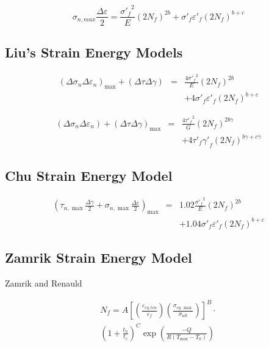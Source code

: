 \documentclass[preprint,5p,twocolumn,11pt,sort&compress]{elsarticle}
\begin{document}
\[{\sigma _{n,max}}\frac{{\Delta \varepsilon }}{2} = \frac{{{{\sigma '}_f}^2}}{E}{\left( {2{N_f}} \right)^{2b}} + {\sigma '_f}{\varepsilon '_f}{\left( {2{N_f}} \right)^{b + c}}\]

\subsection{Liu's Strain Energy Models}
\begin{eqnarray*}
{\left( {\Delta {\sigma _n}\Delta {\varepsilon _n}} \right)_{\max }} + \left( {\Delta \tau \Delta \gamma } \right) &=& \frac{{4{{\sigma '}_f}^2}}{E}{\left( {2{N_f}} \right)^{2b}}
\\
& & + 4{{\sigma '}_f}{{\varepsilon '}_f}{\left( {2{N_f}} \right)^{b + c}}
\end{eqnarray*}

\begin{eqnarray*}
\left( {\Delta {\sigma _n}\Delta {\varepsilon _n}} \right) + {\left( {\Delta \tau \Delta \gamma } \right)_{\max }} &=& \frac{{4{{\tau '}_f}^2}}{G}{\left( {2{N_f}} \right)^{2b\gamma }}
\\
&& + 4{{\tau '}_f}{{\gamma '}_f}{\left( {2{N_f}} \right)^{b\gamma  + c\gamma }}
\end{eqnarray*}

\subsection{Chu Strain Energy Model}
\begin{eqnarray*}
{\left( {{\tau _{n,\max }}\frac{{\Delta \gamma }}{2} + {\sigma _{n,\max }}\frac{{\Delta \varepsilon }}{2}} \right)_{\max }} &=& 1.02\frac{{{{\sigma '}_f}^2}}{E}{\left( {2{N_f}} \right)^{2b}} \\
&& + 1.04{{\sigma '}_f}{{\varepsilon '}_f}{\left( {2{N_f}} \right)^{b + c}}
\end{eqnarray*}

\subsection{Zamrik Strain Energy Model}

Zamrik and Renauld \cite{Zamrik2000}

\begin{equation}
\begin{aligned}
{N_f} = A{\left[ {\left( {\frac{{{\varepsilon _{eq,ten}}}}{{{\varepsilon _f}}}} \right)\left( {\frac{{{\sigma _{eq,\max }}}}{{{\sigma _{ult}}}}} \right)} \right]^B} \cdot \\
{\left( {1 + \frac{{{t_h}}}{{{t_c}}}} \right)^C}\exp \left( {\frac{{ - Q}}{{R\left( {{T_{\max }} - {T_0}} \right)}}} \right)
\end{aligned}
\label{Equ:StudyModel}
\end{equation}
\end{document}
